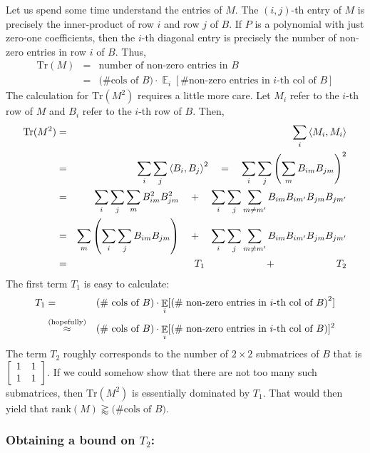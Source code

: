 \documentclass[12pt]{report}
\newcommand{\rank}{\mathrm{rank}}
\begin{document}
Let us spend some time understand the entries of $M$. The $(i,j)$-th entry of $M$ is precisely the inner-product of row $i$ and row $j$ of $B$. If $P$ is a polynomial with just zero-one coefficients, then the $i$-th diagonal entry is precisely the number of non-zero entries in row $i$ of $B$. Thus,
\begin{eqnarray*}
\mathrm{Tr}(M) & = & \text{number of non-zero entries in $B$}\\
  & = & \text{(\# cols of $B$)} \cdot \mathop{\mathbb{E}}_i[\text{\# non-zero entries in $i$-th col of $B$}] 
\end{eqnarray*}
The calculation for $\mathrm{Tr}(M^2)$ requires a little more care. Let $M_i$ refer to the $i$-th row of $M$ and $B_i$ refer to the $i$-th row of $B$. Then,
\begin{eqnarray*}
\mathrm{Tr}(M^2) & = & \sum_{i} \left\langle M_i, M_i\right\rangle\\
 & = & \sum_{i} \sum_j \left\langle B_i, B_j\right\rangle^2 \quad = \quad\sum_{i} \sum_j \left(\sum_m B_{im} B_{jm}\right)^2\\
 & = & \sum_{i} \sum_j \sum_m B_{im}^2 B_{jm}^2  \quad + \quad \sum_i \sum_j \sum_{m\neq m'} B_{im}B_{im'}B_{jm}B_{jm'}\\
 & = & \sum_{m} \left(\sum_i \sum_j B_{im} B_{jm}\right)  \quad + \quad \sum_i \sum_j \sum_{m\neq m'} B_{im}B_{im'}B_{jm}B_{jm'}\\
 & = & \quad\quad\quad T_1 \quad\quad\quad\quad\quad\quad + \quad\quad\quad\quad\quad\quad T_2
\end{eqnarray*}
The first term $T_1$ is easy to calculate:
\begin{eqnarray*}
T_1 & = & \text{(\# cols of $B$)} \cdot \mathop{\mathbb{E}}_i[\left(\text{\# non-zero entries in $i$-th col of $B$}\right)^2] \\
 & \stackrel{\tiny \text{(hopefully)}}{\approx} & \text{(\# cols of $B$)} \cdot \mathop{\mathbb{E}}_i[\left(\text{\# non-zero entries in $i$-th col of $B$}\right)]^2
\end{eqnarray*}
The term $T_2$ roughly corresponds to the number of $2\times 2$ submatrices of $B$ that is $\left[\begin{array}{cc}1 & 1 \\ 1 & 1\end{array}\right]$. If we could somehow show that there are not too many such submatrices, then $\mathrm{Tr}(M^2)$ is essentially dominated by $T_1$. That would then yield that $\rank(M) \gtrapprox \text{(\# cols of $B$)}$. 

\subsubsection*{Obtaining a bound on $T_2$:}
\end{document}

